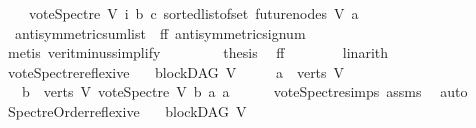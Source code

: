 \begin{isabellebody}
\ \ \ \ {\isacharparenleft}{\kern0pt}vote{\isacharunderscore}{\kern0pt}Spectre\ V\ i\ b\ c{\isacharparenright}{\kern0pt}{\isacharparenright}{\kern0pt}\ {\isacharparenleft}{\kern0pt}sorted{\isacharunderscore}{\kern0pt}list{\isacharunderscore}{\kern0pt}of{\isacharunderscore}{\kern0pt}set\ {\isacharparenleft}{\kern0pt}future{\isacharunderscore}{\kern0pt}nodes\ V\ a{\isacharparenright}{\kern0pt}{\isacharparenright}{\kern0pt}{\isacharparenright}{\kern0pt}{\isacharparenright}{\kern0pt}{\isacharparenright}{\kern0pt}{\isachardoublequoteclose}\ \isanewline
\ \ \ \ \ \ \isamarkupfalse%
\ \ antisymmetric{\isacharunderscore}{\kern0pt}sumlist\ {}\ ff{}\ antisymmetric{\isacharunderscore}{\kern0pt}signum\ \isanewline
\ \ \ \ \ \ \isamarkupfalse%
\ {\isacharparenleft}{\kern0pt}metis\ verit{\isacharunderscore}{\kern0pt}minus{\isacharunderscore}{\kern0pt}simplify{\isacharparenleft}{\kern0pt}{}{\isacharparenright}{\kern0pt}{\isacharparenright}{\kern0pt}\ \isanewline
\ \ \ \ \isamarkupfalse%
\ \isamarkupfalse%
\ {\isacharquery}{\kern0pt}thesis\ \isamarkupfalse%
\ ff\isanewline
\ \ \ \ \ \ \isamarkupfalse%
\ linarith\ \isanewline
\ \ \isamarkupfalse%
\ \ \isanewline
{}\isamarkupfalse%
%
\endisatagproof
{\isafoldproof}%
%
\isadelimproof
\isanewline
%
\endisadelimproof
\isanewline
\isanewline
{}\isamarkupfalse%
\ vote{\isacharunderscore}{\kern0pt}Spectre{\isacharunderscore}{\kern0pt}reflexive{\isacharcolon}{\kern0pt}\isanewline
\ \ \ {\isachardoublequoteopen}blockDAG\ V{\isachardoublequoteclose}\isanewline
\ \ \ \ \ {\isachardoublequoteopen}a\ {\isasymin}\ verts\ V{\isachardoublequoteclose}\isanewline
\ \ \ {\isachardoublequoteopen}{\isasymforall}b\ {\isasymin}\ verts\ V{\isachardot}{\kern0pt}\ vote{\isacharunderscore}{\kern0pt}Spectre\ V\ b\ a\ a\ {\isacharequal}{\kern0pt}\ {}\ {\isachardoublequoteclose}%
\isadelimproof
\ %
\endisadelimproof
%
\isatagproof
{}\isamarkupfalse%
\ vote{\isacharunderscore}{\kern0pt}Spectre{\isachardot}{\kern0pt}simps\ assms\ \isamarkupfalse%
\ auto%
\endisatagproof
{\isafoldproof}%
%
\isadelimproof
%
\endisadelimproof
\ \isanewline
\isanewline
{}\isamarkupfalse%
\ Spectre{\isacharunderscore}{\kern0pt}Order{\isacharunderscore}{\kern0pt}reflexive{\isacharcolon}{\kern0pt}\isanewline
\ \ \ {\isachardoublequoteopen}blockDAG\ V{\isachardoublequoteclose}\isanewline

\end{isabellebody}
